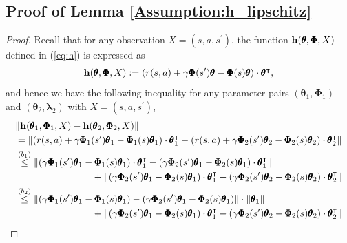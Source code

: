 \documentclass{article} %
\def\eqref#1{equation~\ref{#1}}
\theoremstyle{plain}
\theoremstyle{definition}
\theoremstyle{remark}
\renewcommand{\eqref}[1]{(\ref{#1})}
\begin{document}
{\subsection{Proof of Lemma \ref{Assumption:h_lipschitz}}


\begin{proof}

Recall that for any observation $X=(s, a, s^\prime)$, the function $\mathbf{h}(\pmb{\theta}, \pmb{\Phi}, X)$ defined in \eqref{eq:h} is expressed as
\begin{align*}
   \mathbf{h}(\pmb{\theta}, \pmb{\Phi}, X):=(r(s,a)+\gamma \pmb{\Phi}(s^\prime) \pmb{\theta}-\pmb{\Phi}(s)\pmb{\theta})\cdot\pmb{\theta}^\intercal,
\end{align*}
and hence we have the following inequality for any parameter pairs $(\pmb{\theta}_1, \pmb{\Phi}_1)$ and $(\pmb{\theta}_2, \pmb{\lambda}_2)$ with $X=(s,a,s^\prime)$,
\begin{align*}
   &\| \bh(\pmb{\theta}_1, \pmb{\Phi}_1, X)- \bh(\pmb{\theta}_2, \pmb{\Phi}_2, X)\|\allowdisplaybreaks\\
   &=\|(r(s,a)+\gamma \pmb{\Phi}_1(s^\prime) \pmb{\theta}_1-\pmb{\Phi}_1(s)\pmb{\theta}_1)\cdot\pmb{\theta}_1^\intercal-(r(s,a)+\gamma \pmb{\Phi}_2(s^\prime) \pmb{\theta}_2-\pmb{\Phi}_2(s)\pmb{\theta}_2)\cdot\pmb{\theta}_2^\intercal\|\allowdisplaybreaks\\
    &\overset{(b_1)}{\leq} \|(\gamma \pmb{\Phi}_1(s^\prime) \pmb{\theta}_1-\pmb{\Phi}_1(s)\pmb{\theta}_1)\cdot\pmb{\theta}_1^\intercal-(\gamma \pmb{\Phi}_2(s^\prime) \pmb{\theta}_1-\pmb{\Phi}_2(s)\pmb{\theta}_1)\cdot\pmb{\theta}_1^\intercal\|\nonumber\allowdisplaybreaks\\
    &\qquad\qquad\qquad\qquad+\|(\gamma \pmb{\Phi}_2(s^\prime) \pmb{\theta}_1-\pmb{\Phi}_2(s)\pmb{\theta}_1)\cdot\pmb{\theta}_1^\intercal-(\gamma \pmb{\Phi}_2(s^\prime) \pmb{\theta}_2-\pmb{\Phi}_2(s)\pmb{\theta}_2)\cdot\pmb{\theta}_2^\intercal\|\allowdisplaybreaks\\
   &\overset{(b_2)}{\leq} \|(\gamma \pmb{\Phi}_1(s^\prime) \pmb{\theta}_1-\pmb{\Phi}_1(s)\pmb{\theta}_1)-(\gamma \pmb{\Phi}_2(s^\prime) \pmb{\theta}_1-\pmb{\Phi}_2(s)\pmb{\theta}_1)\|\cdot\|\pmb{\theta}_1\|\allowdisplaybreaks\\
   &\qquad\qquad\qquad\qquad+\|(\gamma \pmb{\Phi}_2(s^\prime) \pmb{\theta}_1-\pmb{\Phi}_2(s)\pmb{\theta}_1)\cdot\pmb{\theta}_1^\intercal-(\gamma \pmb{\Phi}_2(s^\prime) \pmb{\theta}_2-\pmb{\Phi}_2(s)\pmb{\theta}_2)\cdot\pmb{\theta}_2^\intercal\|\allowdisplaybreaks\\

\end{align*}
\end{proof}}
\end{document}
